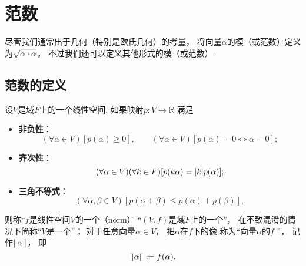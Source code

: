 \section{范数}
尽管我们通常出于几何（特别是欧氏几何）的考量，
将向量\(\alpha\)的模（或范数）定义为\(\sqrt{\alpha\cdot\alpha}\)，
不过我们还可以定义其他形式的模（或范数）.

\subsection{范数的定义}
\begin{definition}
设\(V\)是域\(F\)上的一个线性空间.
如果映射\(p\colon V \to \mathbb{R}\)
满足\begin{itemize}
	\item {\rm\bf 非负性}：\begin{equation*}
		(\forall \alpha \in V)
		[p(\alpha) \geq 0],
		\qquad
		(\forall \alpha \in V)
		[
			p(\alpha) = 0
			\iff
			\alpha = 0
		];
	\end{equation*}

	\item {\rm\bf 齐次性}：\begin{equation*}
		(\forall \alpha \in V)
		(\forall k \in F)
		[
			p(k \alpha) = \abs{k} p(\alpha)
		];
	\end{equation*}

	\item {\rm\bf 三角不等式}：\begin{equation*}
		(\forall \alpha,\beta \in V)
		[
			p(\alpha+\beta) \leq p(\alpha) + p(\beta)
		],
	\end{equation*}
\end{itemize}
则称“\(f\)是线性空间\(V\)的一个（norm）”
“\((V,f)\)是域\(F\)上的一个”，
在不致混淆的情况下简称“\(V\)是一个”；
对于任意向量\(\alpha \in V\)，
把\(\alpha\)在\(f\)下的像
称为“向量\(\alpha\)的\(f\) ”，
记作\(\norm{\alpha}\)，
即\begin{equation*}
	\norm{\alpha}
	:=
	f(\alpha).
\end{equation*}
\end{definition}

